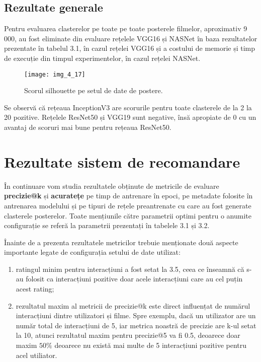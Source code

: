 \subsection{Rezultate generale}
Pentru evaluarea clasterelor pe toate pe toate posterele filmelor, aproximativ 9 000, au fost eliminate din evaluare rețelele VGG16 și NASNet în baza rezultatelor prezentate în tabelul 3.1, în cazul rețelei VGG16 și a costului de memorie și timp de execuție din timpul experimentelor, în cazul rețelei NASNet.
\begin{figure}[!h]
	\centering
	\texttt{[image: img\_4\_17]}
	\caption[Scorul silhouette pe setul de date de postere]{Scorul silhouette pe setul de date de postere.}
\end{figure} 
Se observă că rețeaua InceptionV3 are scorurile pentru toate clasterele de la 2 la 20 pozitive. Rețelele ResNet50 și VGG19 sunt negative, însă apropiate de 0 cu un avantaj de scoruri mai bune pentru rețeaua ResNet50.

\section{Rezultate sistem de recomandare}
În continuare vom studia rezultatele obținute de metricile de evaluare \textbf{precizie@k} și \textbf{acuratețe} pe timp de antrenare în epoci, pe metadate folosite în antrenarea modelului și pe tipuri de rețele preantrenate cu care au fost generate clasterele posterelor. Toate mențiunile către parametrii optimi pentru o anumite configurație se referă la parametrii prezentați în tabelele 3.1 și 3.2.

Înainte de a prezenta rezultatele metricilor trebuie menționate două aspecte importante legate de configurația setului de date utilizat:
\begin{enumerate}
	\item ratingul minim pentru interacțiuni a fost setat la 3.5, ceea ce înseamnă că s-au folosit ca interacțiuni pozitive doar acele interacțiuni care au cel puțin acest rating;
	\item rezultatul maxim al metricii de precizie@k este direct influențat de numărul interacțiuni dintre utilizatori și filme. Spre exemplu, dacă un utilizator are un număr total de interacțiuni de 5, iar metrica noastră de precizie are k-ul setat la 10, atunci rezultatul maxim pentru precizie@5 va fi 0.5, deoarece doar maxim $50\%$ deoarece nu există mai multe de 5 interacțiuni pozitive pentru acel utiliator.
\end{enumerate}

